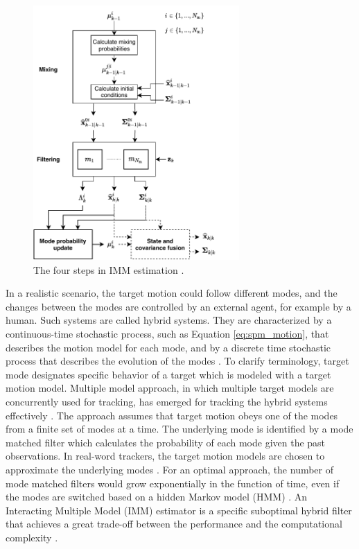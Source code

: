 \documentclass[english, 12pt, a4paper, elec, utf8, a-1b, online]{aaltothesis}
\begin{document}
\begin{figure}[b]
    \centering
    \includegraphics[width=0.7\textwidth]{figures/IMM.pdf}
    \caption{
    The four steps in IMM estimation \cite{BarShalom2001}.}
    \label{fig:IMM}
\end{figure}

In a realistic scenario, the target motion could follow different modes, and the changes between the modes are controlled by an external agent, for example by a human.
Such systems are called hybrid systems. 
They are characterized by a continuous-time stochastic process, such as Equation \eqref{eq:spm_motion}, that describes the motion model for each mode, and by a discrete time stochastic process that describes the evolution of the modes \cite{Mazor1998}.
To clarify terminology, target mode designates specific behavior of a target which is modeled with a target motion model.
Multiple model approach, in which multiple target models are concurrently used for tracking, has emerged for tracking the hybrid systems effectively \cite{BarShalom2001}.
The approach assumes that target motion obeys one of the modes from a finite set of modes at a time.
The underlying mode is identified by a mode matched filter which calculates the probability of each mode given the past observations.
In real-word trackers, the target motion models are chosen to approximate the underlying modes \cite{Simeonova2002}.
For an optimal approach, the number of mode matched filters would grow exponentially in the function of time, even if the modes are switched based on a hidden Markov model (HMM) \cite{BarShalom2001}.
An Interacting Multiple Model (IMM) estimator is a specific suboptimal hybrid filter that achieves a great trade-off between the performance and the computational complexity \cite{Mazor1998}.
\end{document}
